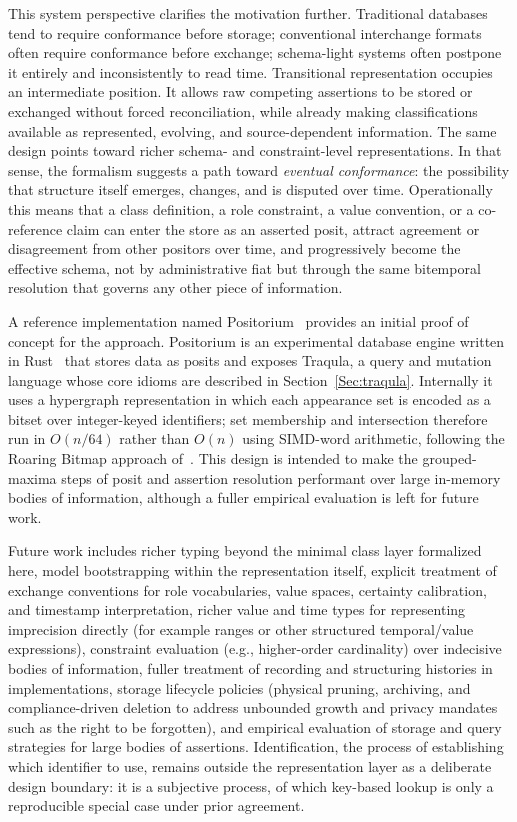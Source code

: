 \documentclass[a4paper,fleqn]{cas-sc}
\begin{document}
This system perspective clarifies the motivation further. Traditional databases tend to require conformance before storage; conventional interchange formats often require conformance before exchange; schema-light systems often postpone it entirely and inconsistently to read time. Transitional representation occupies an intermediate position. It allows raw competing assertions to be stored or exchanged without forced reconciliation, while already making classifications available as represented, evolving, and source-dependent information. The same design points toward richer schema- and constraint-level representations. In that sense, the formalism suggests a path toward \emph{eventual conformance}: the possibility that structure itself emerges, changes, and is disputed over time. Operationally this means that a class definition, a role constraint, a value convention, or a co-reference claim can enter the store as an asserted posit, attract agreement or disagreement from other positors over time, and progressively become the effective schema, not by administrative fiat but through the same bitemporal resolution that governs any other piece of information.

A reference implementation named Positorium~\cite{Positorium} provides an initial proof of concept for the approach. Positorium is an experimental database engine written in Rust~\cite{Matsakis} that stores data as posits and exposes Traqula, a query and mutation language whose core idioms are described in Section~\ref{Sec:traqula}. Internally it uses a hypergraph representation in which each appearance set is encoded as a bitset over integer-keyed identifiers; set membership and intersection therefore run in $O(n/64)$ rather than $O(n)$ using SIMD-word arithmetic, following the Roaring Bitmap approach of~\cite{Chambi}. This design is intended to make the grouped-maxima steps of posit and assertion resolution performant over large in-memory bodies of information, although a fuller empirical evaluation is left for future work.

Future work includes richer typing beyond the minimal class layer formalized here, model bootstrapping within the representation itself, explicit treatment of exchange conventions for role vocabularies, value spaces, certainty calibration, and timestamp interpretation, richer value and time types for representing imprecision directly (for example ranges or other structured temporal/value expressions), constraint evaluation (e.g., higher-order cardinality) over indecisive bodies of information, fuller treatment of recording and structuring histories in implementations, storage lifecycle policies (physical pruning, archiving, and compliance-driven deletion to address unbounded growth and privacy mandates such as the right to be forgotten), and empirical evaluation of storage and query strategies for large bodies of assertions. Identification, the process of establishing which identifier to use, remains outside the representation layer as a deliberate design boundary: it is a subjective process, of which key-based lookup is only a reproducible special case under prior agreement.
\end{document}
